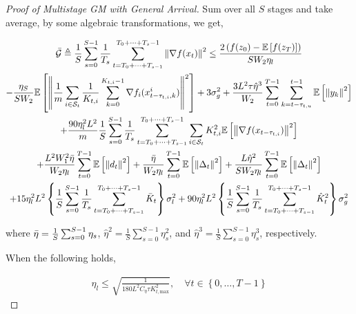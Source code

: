 \begin{proof}[Proof of Multistage GM with General Arrival]
 

Sum over all $S$ stages and take average, by some algebraic transformations, we get,

\begin{equation}
\begin{gathered}
\Bar{\mathcal{G}}\triangleq\frac{1}{S}\sum_{s=0}^{S-1} \frac{1}{T_s}\sum_{t=T_0+\dots+T_{s-1} }^{T_0+\dots+T_s-1} \left\|\nabla f(x_t)\right\|^2
\leq \frac{2\left(f(z_0) - \mathbb{E}\left[f(z_{T})\right]  \right)}{S W_2 \eta_l} \\
- \frac{\eta_S}{S W_2} \mathbb{E}\left[\left\| \frac{1}{m}\sum_{i\in\mathcal{S}_t} \frac{1}{K_{t,i}} \sum_{k=0}^{K_{t,i}-1} \nabla f_i(x_{t-\tau_{t,i},k}^i) \right\|^2\right] + 3 \sigma_g^2
+  \frac{3 L^2 \tau \hat{\eta}^3}{W_2} \sum_{t=0}^{T-1} \sum_{k=t-\tau_{t,u}}^{t-1}\mathbb{E}\left[\left\|  y_k \right\|^2\right] \\
+ \frac{90 \eta_l^2 L^2}{m} \frac{1}{S}\sum_{s=0}^{S-1} \frac{1}{T_s}\sum_{t=T_0+\dots+T_{s-1} }^{T_0+\dots+T_s-1} \sum_{i\in\mathcal{S}_t} K_{t,i}^2\mathbb{E}\left[\left\| \nabla f(x_{t-\tau_{t,i}})\right\|^2\right] \\
+ \frac{L^2 W_1^2 \Bar{\eta}}{W_2 \eta_l} \sum_{t=0}^{T-1}\mathbb{E}\left[\left\| d_t\right\|^2\right] + \frac{\Bar{\eta}}{W_2 \eta_l} \sum_{t=0}^{T-1} \mathbb{E}\left[\left\|\Delta_t\right\|^2\right]  + \frac{L\hat{\eta}^2}{S W_2 \eta_l} \sum_{t=0}^{T-1} \mathbb{E}\left[\left\| \Delta_t\right\|^2\right]\\
+ 15 \eta^2_l L^2 \left\{\frac{1}{S}\sum_{s=0}^{S-1} \frac{1}{T_s}\sum_{t=T_0+\dots+T_{s-1} }^{T_0+\dots+T_s-1} \Bar{K}_t\right\} \sigma_l^2 + 90 \eta^2_l L^2 \left\{\frac{1}{S}\sum_{s=0}^{S-1} \frac{1}{T_s}\sum_{t=T_0+\dots+T_{s-1} }^{T_0+\dots+T_s-1} \hat{K}_t^2 \right\} \sigma_g^2
\end{gathered}\nonumber
\end{equation}

where $\Bar{\eta}=\frac{1}{S}\sum_{s=0}^{S-1}\eta_s$, $\hat{\eta}^2=\frac{1}{S}\sum_{s=0}^{S-1}\eta^2_s$, and $\hat{\eta}^3=\frac{1}{S}\sum_{s=0}^{S-1}\eta^3_s$, respectively.

When the following holds, 

\begin{equation}
\begin{gathered}
\eta_l \leq \sqrt{\frac{1}{ 180L^2 C_\eta \tau K_{t,\text{max}}^2}}, \quad  \forall t \in \left\{0,\dots,T-1\right\}
\end{gathered}\nonumber
\end{equation}


\end{proof}
